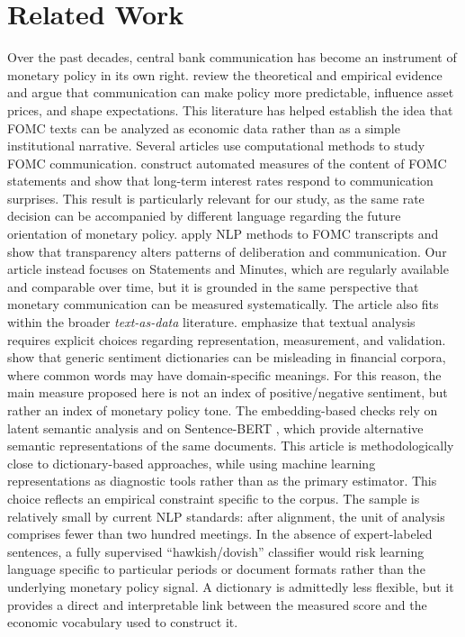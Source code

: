 \documentclass{article}
\begin{document}
\section{Related Work}
Over the past decades, central bank communication has become an instrument of monetary policy in its own right. \citet{blinder2008communication} review the theoretical and empirical evidence and argue that communication 
can make policy more predictable, influence asset prices, and shape expectations. This literature has helped establish the idea that FOMC texts can be analyzed as economic data rather than as a simple institutional narrative.
Several articles use computational methods to study FOMC communication. \citet{lucca2009measuring} construct automated measures of the content of FOMC statements and show that long-term interest rates respond to communication surprises. 
This result is particularly relevant for our study, as the same rate decision can be accompanied by different language regarding the future orientation of monetary policy. \citet{hansen2018transparency} apply NLP methods to FOMC 
transcripts and show that transparency alters patterns of deliberation and communication. Our article instead focuses on Statements and Minutes, which are regularly available and comparable over time, but it is grounded in the same 
perspective that monetary communication can be measured systematically.
The article also fits within the broader \textit{text-as-data} literature. \citet{gentzkow2019text} emphasize that textual analysis requires explicit choices regarding representation, measurement, 
and validation. \citet{loughran2011liability} show that generic sentiment dictionaries can be misleading in financial corpora, where common words may have domain-specific meanings. For this reason, the main measure proposed here 
is not an index of positive/negative sentiment, but rather an index of monetary policy tone. The embedding-based checks rely on latent semantic analysis \citep{deerwester1990indexing} and on 
Sentence-BERT \citep{reimers2019sentencebert}, which provide alternative semantic representations of the same documents.
This article is methodologically close to dictionary-based approaches, while using machine learning representations as diagnostic tools rather than as the primary estimator. This choice reflects an empirical constraint specific 
to the corpus. The sample is relatively small by current NLP standards: after alignment, the unit of analysis comprises fewer than two hundred meetings. In the absence of expert-labeled sentences, a fully supervised ``hawkish/dovish'' 
classifier would risk learning language specific to particular periods or document formats rather than the underlying monetary policy signal. A dictionary is admittedly less flexible, but it provides a direct and interpretable link 
between the measured score and the economic vocabulary used to construct it.
\end{document}
